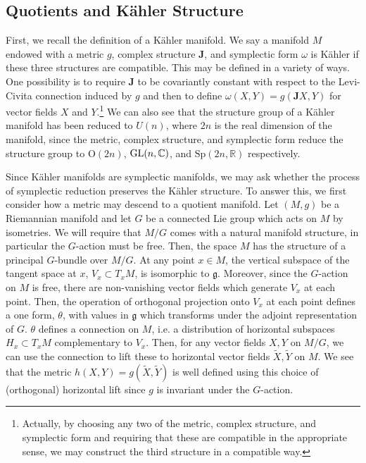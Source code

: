 \subsection{Quotients and K\"ahler Structure}
First, we recall the definition of a K\"ahler manifold. We say a manifold $M$ endowed with a metric $g$, complex structure $\mathbf{J}$, and symplectic form $\omega$ is K\"ahler if these three structures are compatible. This may be defined in a variety of ways. One possibility is to require $\mathbf{J}$ to be covariantly constant with respect to the Levi-Civita connection induced by $g$ and then to define $\omega(X,Y) = g(\mathbf{J}X,Y)$ for vector fields $X$ and $Y$.\footnote{Actually, by choosing any two of the metric, complex structure, and symplectic form and requiring that these are compatible in the appropriate sense, we may construct the third structure in a compatible way.} We can also see that the structure group of a K\"ahler manifold has been reduced to $U(n)$, where $2n$ is the real dimension of the manifold, since the metric, complex structure, and symplectic form reduce the structure group to $\mathrm{O}(2n)$, $\mathrm{GL}(n,\mathbb{C})$, and $\mathrm{Sp}(2n,\mathbb{R})$ respectively. 

Since K\"ahler manifolds are symplectic manifolds, we may ask whether the process of symplectic reduction preserves the K\"ahler structure. To answer this, we first consider how a metric may descend to a quotient manifold. Let $(M,g)$ be a Riemannian manifold and let $G$ be a connected Lie group which acts on $M$ by isometries. We will require that $M/G$ comes with a natural manifold structure, in particular the $G$-action must be free. Then, the space $M$ has the structure of a principal $G$-bundle over $M/G$. At any point $x\in M$, the vertical subspace of the tangent space at $x$, $V_x\subset T_xM$, is isomorphic to $\mathfrak{g}$. Moreover, since the $G$-action on $M$ is free, there are non-vanishing vector fields which generate $V_x$ at each point. Then, the operation of orthogonal projection onto $V_x$ at each point defines a one form, $\theta$, with values in $\mathfrak{g}$ which transforms under the adjoint representation of $G$. $\theta$ defines a connection on $M$, i.e. a distribution of horizontal subspaces $H_x\subset T_xM$ complementary to $V_x$. Then, for any vector fields $X,Y$ on $M/G$, we can use the connection to lift these to horizontal vector fields $\tilde{X},\tilde{Y}$ on $M$. We see that the metric $h(X,Y) = g(\tilde{X},\tilde{Y})$ is well defined using this choice of (orthogonal) horizontal lift since $g$ is invariant under the $G$-action. 

